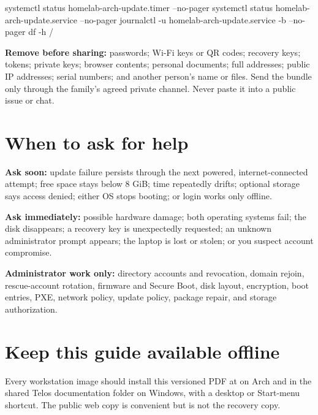 \begin{shellblock}
systemctl status homelab-arch-update.timer --no-pager
systemctl status homelab-arch-update.service --no-pager
journalctl -u homelab-arch-update.service -b --no-pager
df -h /
\end{shellblock}


\textbf{Remove before sharing:} passwords; Wi-Fi keys or QR codes; recovery
keys; tokens; private keys; browser contents; personal documents; full
addresses; public IP addresses; serial numbers; and another person's name or
files. Send the bundle only through the family's agreed private channel. Never
paste it into a public issue or chat.


\section{When to ask for help}

\textbf{Ask soon:} update failure persists through the next powered,
internet-connected attempt; free space stays below 8 GiB; time repeatedly
drifts; optional storage says access denied; either OS stops booting; or login
works only offline.

\textbf{Ask immediately:} possible hardware damage; both operating systems
fail; the disk disappears; a recovery key is unexpectedly requested; an
unknown administrator prompt appears; the laptop is lost or stolen; or you
suspect account compromise.

\textbf{Administrator work only:} directory accounts and revocation, domain
rejoin, rescue-account rotation, firmware and Secure Boot, disk layout,
encryption, boot entries, PXE, network policy, update policy, package repair,
and storage authorization.

\section{Keep this guide available offline}

Every workstation image should install this versioned PDF at
 on Arch and in
the shared Telos documentation folder on Windows, with a desktop or Start-menu
shortcut. The public web copy is convenient but is not the recovery copy.

